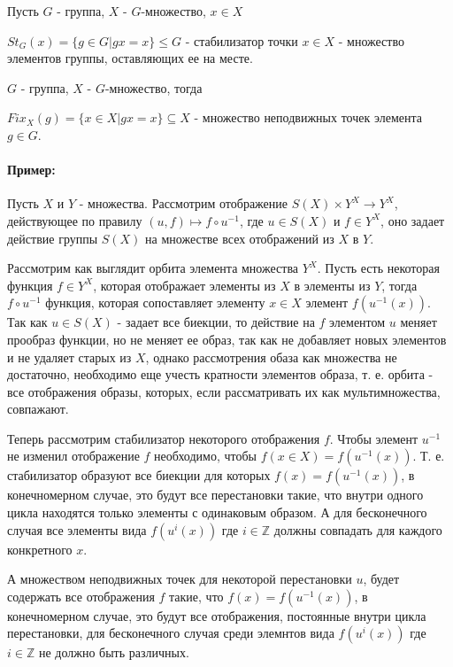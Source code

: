 \begin{Def}
Пусть $G$ - группа, $X$ - $G$-множество, $x \in X$

$St_G\left(x\right) = \lbrace g \in G | gx = x\rbrace \le G$ - стабилизатор точки $x \in X$ - множество элементов группы, оставляющих ее на месте.
\end{Def}

\begin{Def}
$G$ - группа, $X$ - $G$-множество, тогда

$Fix_X\left(g\right) = \lbrace x \in X | gx = x\rbrace \subseteq X$ - множество неподвижных точек элемента $g \in G$.
\end{Def}

\paragraph{Пример: }
Пусть $X$ и $Y$ - множества. Рассмотрим отображение $S\left(X\right) \times Y^X \rightarrow Y^X$, действующее по правилу $\left(u, f\right) \mapsto f \circ u^{-1}$, где $u \in S\left(X\right)$ и $f \in Y^X$, оно задает действие группы $S\left(X\right)$ на множестве всех отображений из $X$ в $Y$.

Рассмотрим как выглядит орбита элемента множества $Y^X$. Пусть есть некоторая функция $f \in Y^X$, которая отображает элементы из $X$ в элементы из $Y$, тогда $f \circ u^{-1}$ функция, которая сопоставляет элементу $x \in X$ элемент $f\left(u^{-1}\left(x\right)\right)$. Так как $u \in S\left(X\right)$ - задает все биекции, то действие на $f$ элементом $u$ меняет прообраз функции, но не меняет ее образ, так как не добавляет новых элементов и не удаляет старых из $X$, однако рассмотрения обаза как множества не достаточно, необходимо еще учесть кратности элементов образа, т. е. орбита - все отображения образы, которых, если рассматривать их как мультимножества, совпажают.

Теперь рассмотрим стабилизатор некоторого отображения $f$. Чтобы элемент $u^{-1}$ не изменил отображение $f$ необходимо, чтобы $f\left(x \in X\right) = f\left(u^{-1}\left(x\right)\right)$. Т. е. стабилизатор образуют все биекции для которых $f\left(x\right) = f\left(u^{-1}\left(x\right)\right)$, в конечномерном случае, это будут все перестановки такие, что внутри одного цикла находятся только элементы с одинаковым образом. А для бесконечного случая все элементы вида $f\left(u^i\left(x\right)\right)$ где $i \in \mathbb{Z}$ должны совпадать для каждого конкретного $x$.

А множеством неподвижных точек для некоторой перестановки $u$, будет содержать все отображения $f$ такие, что $f\left(x\right) = f\left(u^{-1}\left(x\right)\right)$, в конечномерном случае, это будут все отображения, постоянные внутри цикла перестановки, для бесконечного случая среди элемнтов вида $f\left(u^{i}\left(x\right)\right)$ где $i \in \mathbb{Z}$ не должно быть различных.

